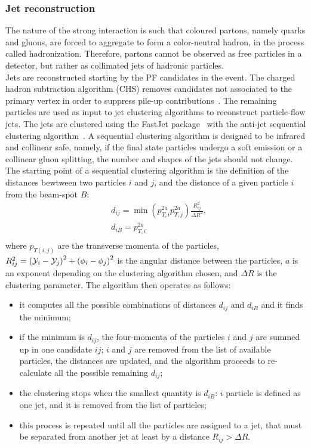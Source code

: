 \subsubsection{Jet reconstruction}
The nature of the strong interaction is such that coloured partons, namely quarks and gluons, are forced to aggregate to form a color-neutral hadron, in the process called hadronization. Therefore, partons cannot be observed as free particles in a detector, but rather as collimated jets of hadronic particles.\\
Jets are reconstructed starting by the PF candidates in the event. The charged hadron subtraction algorithm (CHS) removes candidates not associated to the primary vertex in order to suppress pile-up contributions~\cite{CMS-PAS-JME-14-001}. The remaining particles are used as input to jet clustering algorithms
to reconstruct particle-flow jets. The jets are clustered using the {\sc FastJet} package~\cite{Cacciari:2011ma} with the anti-\kt jet sequential clustering algorithm~\cite{Cacciari:2008gp}. A sequential clustering algorithm is designed to be infrared and collinear safe, namely, if the final state particles undergo a soft emission or a collinear gluon splitting, the number and shapes of the jets should not change. The starting point of a sequential clustering algorithm is the definition of the distances bewtween two particles $i$ and $j$, and the distance of a given particle $i$ from the beam-spot $B$:
\begin{equation}
\begin{split}
& d_{ij} = \min \left( p_{T,i}^{2a} p_{T,j}^{2a} \right) \frac{R_{ij}^2}{\Delta R^2},\\
& d_{iB} = p_{T,i}^{2a}\\
\end{split}
\label{eq:dist_akt}
\end{equation}
where $p_{T(i,j)}$ are the transverse momenta of the particles, $R_{ij}^2 = \left( \mathcal{Y}_i - \mathcal{Y}_j \right)^2 + \left( \phi_i - \phi_j\right)^2$ is the angular distance between the particles, $a$ is an exponent depending on the clustering algorithm chosen, and $\Delta R$ is the clustering parameter. The algorithm then operates as follows:
\begin{itemize}
\item it computes all the possible combinations of distances $d_{ij}$ and $d_{iB}$ and it finds the minimum;
\item if the minimum is $d_{ij}$, the four-momenta of the particles $i$ and $j$ are summed up in one candidate $ij$; $i$ and $j$ are removed from the list of available particles, the distances are updated, and the algorithm proceeds to re-calculate all the possible remaining $d_{ij}$;
\item the clustering stops when the smallest quantity is $d_{iB}$: $i$ particle is defined as one jet, and it is removed from the list of particles;
\item this process is repeated until all the particles are assigned to a jet, that must be separated from another jet at least by a distance $R_{ij} > \Delta R$.
\end{itemize}
